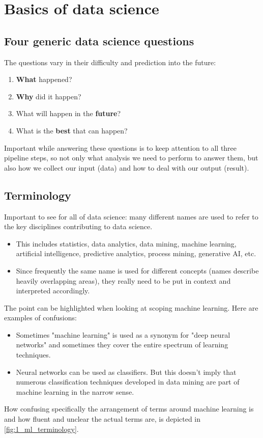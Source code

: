 \section{Basics of data science}
\setcounter{figure}{0}




\subsection*{Four generic data science questions}
The questions vary in their difficulty and prediction into the future:
\begin{enumerate}
  \item \textbf{What} happened?
  \item \textbf{Why} did it happen?
  \item What will happen in the \textbf{future}?
  \item What is the \textbf{best} that can happen?
\end{enumerate}

Important while answering these questions is to keep attention to all three pipeline steps, so not only what analysis we need to perform to answer them, but also how we collect our input (data) and how to deal with our output (result).







\subsection*{Terminology}
Important to see for all of data science: many different names are used to refer to the key disciplines contributing to data science.
\begin{itemize}
  \item This includes statistics, data analytics, data mining, machine learning, artificial intelligence, predictive analytics, process mining, generative AI, etc.
  \item Since frequently the same name is used for different concepts (names describe heavily overlapping areas), they really need to be put in context and interpreted accordingly.
\end{itemize}

The point can be highlighted when looking at scoping machine learning. Here are examples of confusions:
\begin{itemize}
  \item Sometimes "machine learning" is used as a synonym for "deep neural networks" and sometimes they cover the entire spectrum of learning techniques.
  \item Neural networks can be used as classifiers. But this doesn't imply that numerous classification techniques developed in data mining are part of machine learning in the narrow sense.
\end{itemize}
How confusing specifically the arrangement of terms around machine learning is and how fluent and unclear the actual terms are, is depicted in \ref{fig:1_ml_terminology}.

